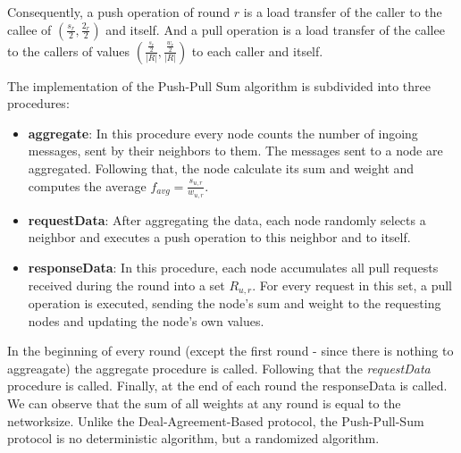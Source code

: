 Consequently, a push operation of round $r$ is a load transfer of the caller to the callee of $\left(\frac{s_{r}}{2}, \frac{2_{r}}{2}\right)$ and itself. And a pull operation is a load transfer of the callee to the callers of values $\left(\frac{\frac{s_{r}}{2}}{|R|}, \frac{\frac{w_{r}}{2}}{|R|}\right)$ to each caller and itself.

The implementation of the Push-Pull Sum algorithm is subdivided into three procedures:
\begin{itemize}
    \item \textbf{aggregate}: In this procedure every node counts the number of ingoing messages, sent by their neighbors to them. The messages sent to a node are aggregated. Following that, the node calculate its sum and weight and computes the average $f_{avg} = \frac{s_{u, r}}{w_{u, r}}$.
    \item \textbf{requestData}: After aggregating the data, each node randomly selects a neighbor and executes a push operation to this neighbor and to itself.
    \item \textbf{responseData}: In this procedure, each node accumulates all pull requests received during the round into a set $R_{u, r}$. For every request in this set, a pull operation is executed, sending the node's sum and weight to the requesting nodes and updating the node's own values.
\end{itemize}
In the beginning of every round (except the first round - since there is nothing to aggreagate) the aggregate procedure is called. Following that the \textit{requestData} procedure is called. Finally, at the end of each round the responseData is called. We can observe that the sum of all weights at any round is equal to the networksize. Unlike the Deal-Agreement-Based protocol, the Push-Pull-Sum protocol is no deterministic algorithm, but a randomized algorithm.